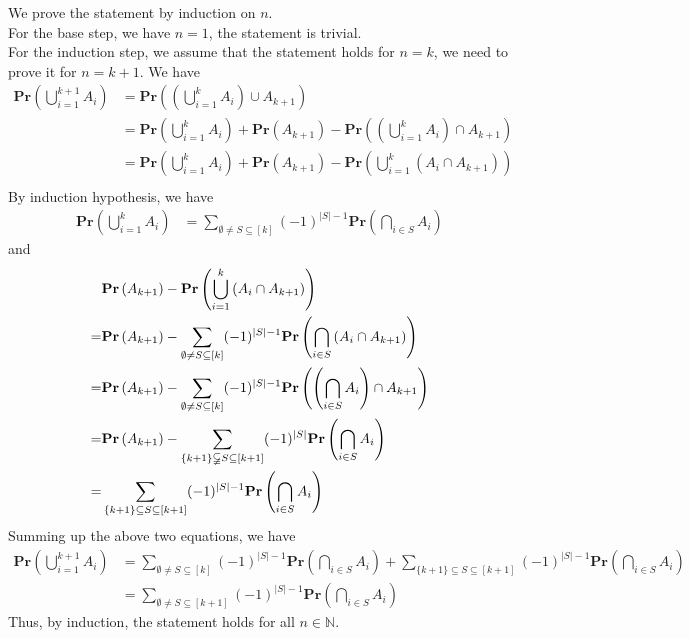 \documentclass[a4paper, justified]{tufte-handout}
\begin{document}
\begin{solution}
  We prove the statement by induction on $n$.\\
  For the base step, we have $n = 1$, the statement is trivial. \\
  For the induction step, we assume that the statement holds for $n = k$, we need to prove it for $n = k + 1$. We have
  \[\begin{aligned}
    \mathbf{Pr}\left( \bigcup_{i=1}^{k+1} A_i \right) &= \mathbf{Pr}\left( \left(\bigcup_{i=1}^{k} A_i\right) \cup A_{k+1} \right)\\
    &= \mathbf{Pr}\left( \bigcup_{i=1}^{k} A_i \right) + \mathbf{Pr}\left( A_{k+1} \right) - \mathbf{Pr}\left( \left(\bigcup_{i=1}^{k} A_i\right) \cap A_{k+1} \right)\\
    &= \mathbf{Pr}\left( \bigcup_{i=1}^{k} A_i \right) + \mathbf{Pr}\left(A_{k+1}\right) - \mathbf{Pr}\left( \bigcup_{i = 1}^k \left(A_i \cap A_{k+1}\right) \right)\\
    \end{aligned}
  \]
  By induction hypothesis, we have
  \[
  \begin{aligned}
  \mathbf{Pr}\left( \bigcup_{i=1}^{k} A_i \right) &= \sum_{\emptyset \neq S \subseteq [k]} (-1)^{|S|-1} \mathbf{Pr}\left( \bigcap_{i \in S} A_i \right)
  \end{aligned}
  \]
  and
  \[
  \begin{aligned}
  &\mathbf{Pr}\left(A_{k+1}\right)-\mathbf{Pr}\left( \bigcup_{i = 1}^k \left(A_i \cap A_{k+1}\right) \right)\\
  =& \mathbf{Pr}\left(A_{k+1}\right)- \sum_{\emptyset \neq S \subseteq [k]} (-1)^{|S|-1} \mathbf{Pr}\left( \bigcap_{i \in S} \left(A_i \cap A_{k+1}\right) \right)\\
  =& \mathbf{Pr}\left(A_{k+1}\right)-\sum_{\emptyset \neq S \subseteq [k]} (-1)^{|S|-1} \mathbf{Pr}\left( \left(\bigcap_{i \in S} A_i\right) \cap A_{k+1} \right)\\
  =& \mathbf{Pr}\left(A_{k+1}\right)-\sum_{\{k + 1\} \varsubsetneqq S \subseteq [k + 1]} (-1)^{|S|} \mathbf{Pr}\left( \bigcap_{i \in S} A_i\right)\\
  =& \sum_{\{k + 1\} \subseteq S \subseteq [k + 1]} (-1)^{|S|-1} \mathbf{Pr}\left( \bigcap_{i \in S} A_i\right)
  \end{aligned}
  \]
  Summing up the above two equations, we have
  \[
  \begin{aligned}
  \mathbf{Pr}\left( \bigcup_{i=1}^{k+1} A_i \right) &= \sum_{\emptyset \neq S \subseteq [k]} (-1)^{|S|-1} \mathbf{Pr}\left( \bigcap_{i \in S} A_i \right) + \sum_{\{k + 1\} \subseteq S \subseteq [k + 1]} (-1)^{|S|-1} \mathbf{Pr}\left( \bigcap_{i \in S} A_i\right)\\
  &= \sum_{\emptyset \neq S \subseteq [k+1]} (-1)^{|S|-1} \mathbf{Pr}\left( \bigcap_{i \in S} A_i \right)
  \end{aligned}
  \]
  Thus, by induction, the statement holds for all $n \in \mathbb{N}$.
\end{solution}
\end{document}
